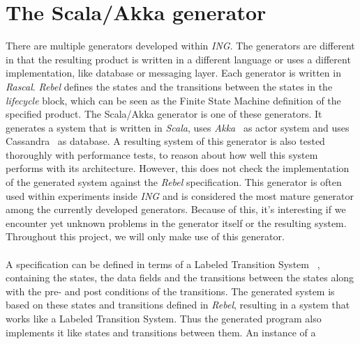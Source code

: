 \section{The Scala/Akka generator}
There are multiple generators developed within \textit{ING}. The generators are
different in that the resulting product is written in a different language or
uses a different implementation, like database or messaging layer. Each
generator is written in \textit{Rascal}. \textit{Rebel} defines the states and
the transitions between the states in the \textit{lifecycle} block, which can be
seen as the Finite State Machine definition of the specified product. The
Scala/Akka generator is one of these generators. It generates a system that is
written in \textit{Scala}, uses \textit{Akka}~\cite{siteAkka2017} as actor
system and uses Cassandra~\cite{siteCassandra2016} as database. A resulting
system of this generator is also tested thoroughly with performance tests, to
reason about how well this system performs with its architecture. However, this
does not check the implementation of the generated system against the
\textit{Rebel} specification. This generator is often used within experiments
inside \textit{ING} and is considered the most mature generator among the
currently developed generators. Because of this, it's interesting if we
encounter yet unknown problems in the generator itself or the resulting system.
Throughout this project, we will only make use of this generator.\\
\\
A specification can be defined in terms of a Labeled Transition
System~\cite{stoel2016solving}%
, containing the states, the data fields and the transitions between the states
along with the pre- and post conditions of the transitions. The generated system
is based on these states and transitions defined in \textit{Rebel}, resulting in
a system that works like a Labeled Transition System. Thus the generated program
also implements it like states and transitions between them. An instance of a
